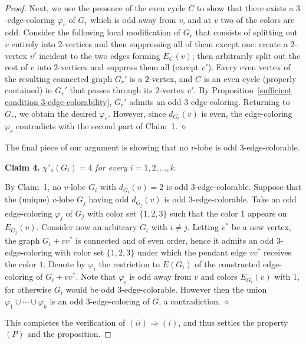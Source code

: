 \documentclass[a4paper,12pt]{article}
\numberwithin{equation}{section}
\begin{document}
\begin{proof}
Next, we use the presence of the even cycle $C$ to show that there exists a $3$-edge-coloring $\varphi_r$ of $G_r$ which is odd away from $v$, and at $v$ two of the colors are odd. Consider the following local modification of $G_r$ that consists of splitting out $v$ entirely into $2$-vertices and then suppressing all of them except one: create a $2$-vertex $v'$ incident to the two edges forming $E_C(v)$; then arbitrarily split out the rest of $v$ into $2$-vertices and suppress them all (except $v'$). Every even vertex of the resulting connected graph $G_r'$ is a $2$-vertex, and $C$ is an even cycle (properly contained) in $G_r'$ that passes through its $2$-vertex $v'$. By Proposition~\ref{sufficient condition 3-edge-colorability}, $G_r'$ admits an odd $3$-edge-coloring. Returning to $G_r$, we obtain the desired $\varphi_r$. However, since $d_{G_r}(v)$ is even, the edge-coloring $\varphi_r$ contradicts with the second part of Claim~1. \hfill$\diamond$



\bigskip

The final piece of our argument is showing that no $v$-lobe is odd $3$-edge-colorable.

\bigskip


\noindent \textbf{Claim 4.} \textit{$\chi'_o(G_i)=4$ for every $i=1,2,\ldots,k$.}

\medskip

\noindent By Claim~1, no $v$-lobe $G_i$ with $d_{G_i}(v)=2$ is odd $3$-edge-colorable.
Suppose that the (unique) $v$-lobe $G_j$ having odd $d_{G_j}(v)$ is odd $3$-edge-colorable.
Take an odd edge-coloring $\varphi_j$ of $G_j$ with color set $\{1,2,3\}$ such that the color $1$ appears  on $E_{G_j}(v)$. Consider now an arbitrary $G_i$ with $i\neq j$. Letting $v^*$ be a new vertex, the graph $G_i+vv^*$ is connected and of even order, hence it admits an odd $3$-edge-coloring with color set $\{1,2,3\}$ under which the pendant edge $vv^*$ receives the color $1$. Denote by $\varphi_i$ the restriction to $E(G_i)$ of the constructed edge-coloring of $G_i+vv^*$. Note that $\varphi_i$ is odd away from $v$ and colors $E_{G_i}(v)$ with $1$, for otherwise $G_i$ would be odd $3$-edge-colorable. However then the union $\varphi_1\cup\cdots\cup\varphi_k$ is an odd $3$-edge-coloring of $G$, a contradiction.
\hfill$\diamond$

\bigskip

This completes the verification of $(ii)\Rightarrow(i)$, and thus settles the property $(P)$ and the proposition.
\end{proof}
\end{document}
